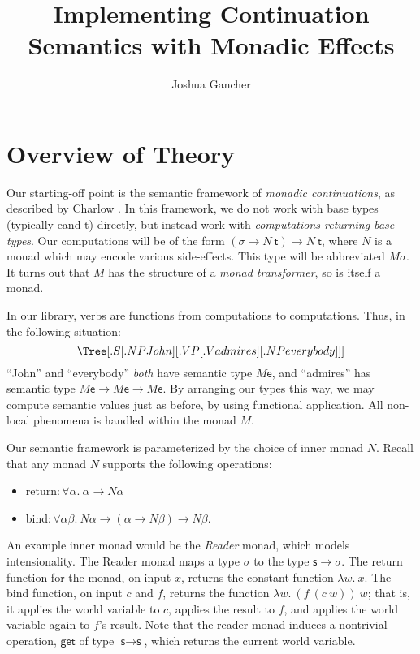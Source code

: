 \documentclass{article}
\newcommand{\Te}{\textsf{e}}
\newcommand{\Tt}{\textsf{t}}
\newcommand{\Ts}{\textsf{s}}
\begin{document}
\title{Implementing Continuation Semantics with Monadic Effects}
\author{Joshua Gancher}

\maketitle
{}

\section{Overview of Theory}
\label{sec:theory}

Our starting-off point is the semantic framework of \emph{monadic continuations}, as described by Charlow \cite{charlow2014semantics}. In this framework, we do not work with base types (typically \Te and \Tt) directly, but instead work with \emph{computations returning base types}. Our computations will be of the form $(\sigma \to N\ \Tt) \to N\ \Tt$, where $N$ is a monad which may encode various side-effects. This type will be abbreviated $M \sigma$. It turns out that $M$ has the structure of a \emph{monad transformer}, so is itself a monad. 

In our library, verbs are functions from computations to computations. Thus, in the following situation:
\[ \Tree [.S [.NP John ] [.VP [.V admires ] [.NP everybody ] ] ] \]
``John'' and ``everybody'' \emph{both} have semantic type $M \Te$, and ``admires'' has semantic type $M \Te \to M \Te \to M \Te$. By arranging our types this way, we may compute semantic values just as before, by using functional application. All non-local phenomena is handled within the monad $M$.

Our semantic framework is parameterized by the choice of inner monad $N$. Recall that any monad $N$ supports the following operations:
\begin{itemize}
    \item \textsf{return}$: \forall \alpha.\ \alpha \to N \alpha$
    \item \textsf{bind}$: \forall \alpha \beta.\ N \alpha \to (\alpha \to N \beta) \to N \beta$.
\end{itemize}

An example inner monad would be the \emph{Reader} monad, which models intensionality. The Reader monad maps a type $\sigma$ to the type $\Ts \to \sigma$. The \textsf{return} function for the monad, on input $x$, returns the constant function $\lambda w.\ x$. The \textsf{bind} function, on input $c$ and $f$, returns the function $\lambda w.\ (f\ (c\ w))\ w$; that is, it applies the world variable to $c$, applies the result to $f$, and applies the world variable again to $f$'s result. Note that the reader monad induces a nontrivial operation, $\textsf{get}$ of type $\Ts \to \Ts$, which returns the current world variable.
\end{document}
